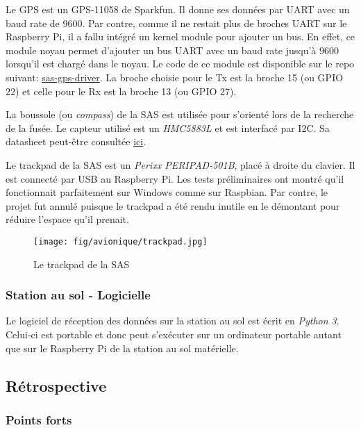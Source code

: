 
Le GPS est un GPS-11058 de Sparkfun. Il donne ses données par UART avec un baud
rate de 9600. Par contre, comme il ne restait plus de broches UART sur le
Raspberry Pi, il a fallu intégré un kernel module pour ajouter un bus. En
effet, ce module noyau permet d'ajouter un bus UART avec un baud rate jusqu'à
9600 lorsqu'il est chargé dans le noyau. Le code de ce module est disponible
sur le repo suivant:
\href{https://github.com/ul-gaul/sas-driver-gps}{sas-gps-driver}. La broche
choisie pour le Tx est la broche 15 (ou GPIO 22) et celle pour le Rx est la
broche 13 (ou GPIO 27).


La boussole (ou \textit{compass}) de la SAS est utilisée pour s'orienté lors de
la recherche de la fusée. Le capteur utilisé est un \textit{HMC5883L} et est
interfacé par I2C. Sa datasheet peut-être consultée
\href{https://cdn-shop.adafruit.com/datasheets/HMC5883L_3-Axis_Digital_Compass_IC.pdf}{ici}.


Le trackpad de la SAS est un \textit{Perixx PERIPAD-501B}, placé à droite du
clavier. Il est connecté par USB au Raspberry Pi. Les tests préliminaires ont
montré qu'il fonctionnait parfaitement sur Windows comme sur Raspbian. Par
contre, le projet fut annulé puisque le trackpad a été rendu inutile en le
démontant pour réduire l'espace qu'il prenait.

\begin{figure}[H]
	\center
	\texttt{[image: fig/avionique/trackpad.jpg]}
	\caption{Le trackpad de la SAS}
	\label{f:trackpad}
\end{figure}

\subsubsection{Station au sol - Logicielle}

Le logiciel de réception des données sur la station au sol est écrit en
\textit{Python 3}. Celui-ci est portable et donc peut s'exécuter sur un
ordinateur portable autant que sur le Raspberry Pi de la station au sol
matérielle.

\subsection{Rétrospective}

\subsubsection{Points forts}

